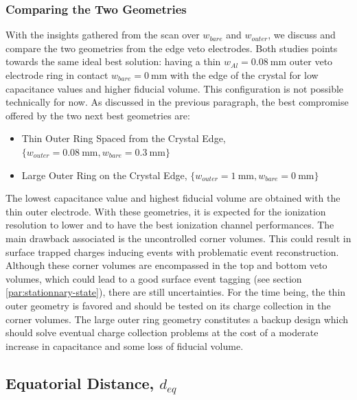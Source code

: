\subsubsection{Comparing the Two Geometries}

With the insights gathered from the scan over $w_{bare}$ and $w_{outer}$, we discuss and compare the two geometries from the edge veto electrodes. Both studies points towards the same ideal best solution: having a thin $w_{Al} = \SI{0.08}{\mm}$ outer veto electrode ring in contact $w_{bare}=\SI{0}{\mm}$ with the edge of the crystal for low capacitance values and higher fiducial volume. This configuration is not possible technically for now. As discussed in the previous paragraph, the best compromise offered by the two next best geometries are:
\begin{itemize}
	\item Thin Outer Ring Spaced from the Crystal Edge, $\{ w_{outer} = \SI{0.08}{\mm}, w_{bare} = \SI{0.3}{\mm} \}$
	\item Large Outer Ring on the Crystal Edge, $\{ w_{outer} = \SI{1}{\mm}, w_{bare} = \SI{0}{\mm} \}$
\end{itemize}

The lowest capacitance value and highest fiducial volume are obtained with the thin outer electrode. With these geometries, it is expected for the ionization resolution to lower and to have the best ionization channel performances. The main drawback associated is the uncontrolled corner volumes. This could result in surface trapped charges inducing events with problematic event reconstruction. Although these corner volumes are encompassed in the top and bottom veto volumes, which could lead to a good surface event tagging (see section \ref{par:stationnary-state}), there are still uncertainties.
For the time being, the thin outer geometry is favored and should be tested on its charge collection in the corner volumes. The large outer ring geometry constitutes a backup design which should solve eventual charge collection problems at the cost of a moderate increase in capacitance and some loss of fiducial volume.



\subsection{Equatorial Distance, $d_{eq}$}
\label{par:equatorial-distance}

